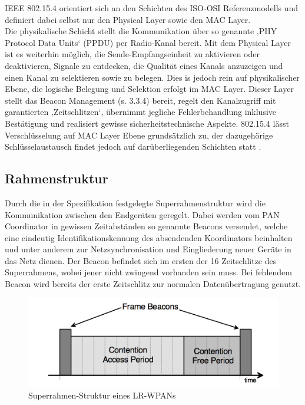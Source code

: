 IEEE 802.15.4 orientiert sich an den Schichten des ISO-OSI Referenzmodells und definiert dabei selbst nur den Physical Layer sowie den MAC Layer. \\
Die physikalische Schicht stellt die Kommunikation über so genannte ‚PHY Protocol Data Units‘ (PPDU) per Radio-Kanal bereit. Mit dem Physical Layer ist es weiterhin möglich, die Sende-Empfangseinheit zu aktivieren oder deaktivieren, Signale zu entdecken, die Qualität eines Kanals anzuzeigen und einen Kanal zu selektieren sowie zu belegen. Dies is jedoch rein auf physikalischer Ebene, die logische Belegung und Selektion erfolgt im MAC Layer.
Dieser Layer stellt das Beacon Management (s. 3.3.4) bereit, regelt den Kanalzugriff mit garantierten ‚Zeitschlitzen‘, übernimmt jegliche Fehlerbehandlung inklusive Bestätigung und realisiert gewisse sicherheitstechnische Aspekte. 802.15.4 lässt Verschlüsselung auf MAC Layer Ebene grundsätzlich zu, der dazugehörige Schlüsselaustausch findet jedoch auf darüberliegenden Schichten statt \cite{d:hesse} \cite{d:ieee}.

\subsection{Rahmenstruktur}\label{ss:Rahmenstruktur}

Durch die in der Spezifikation festgelegte Superrahmenstruktur wird die Kommunikation zwischen den Endgeräten geregelt. Dabei werden vom PAN Coordinator in gewissen Zeitabständen so genannte Beacons versendet, welche eine eindeutig Identifikationskennung des absendenden Koordinators beinhalten und unter anderem zur Netzsynchronisation und Eingliederung neuer Geräte in das Netz dienen. Der Beacon befindet sich im ersten der 16 Zeitschlitze des Superrahmens, wobei jener nicht zwingend vorhanden sein muss. Bei fehlendem Beacon wird bereits der erste Zeitschlitz zur normalen Datenübertragung genutzt. \\

\begin{figure}[H] 
	\centering
	\includegraphics[scale=0.8]{Bilder/superrahmen}
	\caption{Superrahmen-Struktur eines LR-WPANs\cite{d:ieee}}
	\label{f:superrahmen}
\end{figure}

